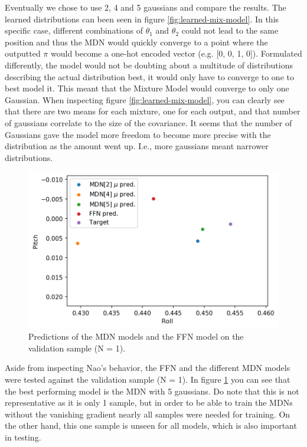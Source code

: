 \documentclass{article}
\begin{document}
    Eventually we chose to use 2, 4 and 5 gaussians and compare the results.
    The learned distributions can been seen in figure \ref{fig:learned-mix-model}.
    In this specific case, different combinations of $\theta_1$ and $\theta_2$ could not lead to the same position and thus the MDN would quickly converge to a point where the outputted $\pi$ would become a one-hot encoded vector (e.g. [0, 0, 1, 0]). 
    Formulated differently, the model would not be doubting about a multitude of distributions describing the actual distribution best, it would only have to converge to one to best model it. 
    This meant that the Mixture Model would converge to only one Gaussian.
    When inspecting figure \ref{fig:learned-mix-model}, you can clearly see that there are two means for each mixture, one for each output, and that number of gaussians correlate to the size of the covariance.
    It seems that the number of Gaussians gave the model more freedom to become more precise with the distribution as the amount went up.
    I.e., more gaussians meant narrower distributions.


    \begin{figure}[!htb]
        \centering
        \includegraphics[width=.8\textwidth]{../part2/all_mod_predictions.png}
        \caption{Predictions of the MDN models and the FFN model on the validation sample (N = 1).}
        \label{fig:pred-models}
    \end{figure}

    Aside from inspecting Nao's behavior, the FFN and the different MDN models were tested against the validation sample (N = 1).
    In figure \ref{fig:pred-models} you can see that the best performing model is the MDN with 5 gaussians.
    Do note that this is not representative as it is only 1 sample, but in order to be able to train the MDNs without the vanishing gradient nearly all samples were needed for training.
    On the other hand, this one sample is unseen for all models, which is also important in testing.
\end{document}
